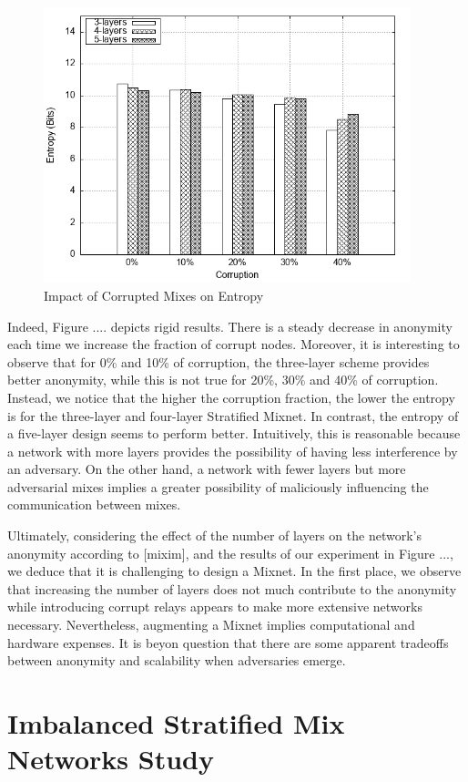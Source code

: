 \documentclass[logo,msc,cyber]{infthesis}   %
\begin{document}
\begin{figure}[h!]
    \centering
    \includegraphics[height=8cm]{figures/mixim/4.png}
    \caption{Impact of Corrupted Mixes on Entropy}
    \label{fig:corrupted-mixes}
 \end{figure}

Indeed, Figure .... depicts rigid results. There is a steady decrease in
anonymity each time we increase the fraction of corrupt nodes. Moreover, it is
interesting to observe that for 0\% and 10\% of corruption, the three-layer scheme
provides better anonymity, while this is not true for 20\%, 30\% and 40\% of
corruption. Instead, we notice that the higher the corruption fraction, the
lower the entropy is for the three-layer and four-layer Stratified Mixnet. In
contrast, the entropy of a five-layer design seems to perform better.
Intuitively, this is reasonable because a network with more layers provides the
possibility of having less interference by an adversary. On the other hand, a
network with fewer layers but more adversarial mixes implies a greater
possibility of maliciously influencing the communication between mixes.

Ultimately, considering the effect of the number of layers on the network's
anonymity according to [mixim], and the results of our experiment in Figure ...,
we deduce that it is challenging to design a Mixnet. In the first place, we
observe that increasing the number of layers does not much contribute to the
anonymity while introducing corrupt relays appears to make more extensive
networks necessary. Nevertheless, augmenting a Mixnet implies computational and
hardware expenses. It is beyon question that there are some apparent tradeoffs
between anonymity and scalability when adversaries emerge.

\chapter{Imbalanced Stratified Mix Networks Study}
\end{document}

